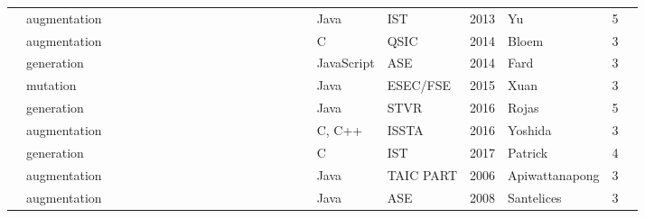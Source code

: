 \begin{table*}
\begin{adjustbox}{max width=\textwidth,center=\textwidth}
\begin{tabular}{llllllllllllllllllllllll}
            \cite{Yu2013}                                   & augmentation                      & \X &    &    &    &    &    &    & \X &    &    & \X &    &    &    &    &    & Java        & IST                                                      & 2013 & Yu             & 5 \\
            \cite{6958388}                                  & augmentation                      & \X &    &    &    & \X &    &    &    &    &    & \X &    &    &    & \X &    & C           & QSIC                                                     & 2014 & Bloem          & 3 \\
            \cite{milani2014}                               & generation                        & \X &    &    &    &    &    & \X &    &    &    & \X &    &    &    &    &    & JavaScript  & ASE                                                      & 2014 & Fard           & 3 \\
            \cite{Xuan:2015:CRV:2786805.2803206}            & mutation                          & \X &    &    &    &    & \X &    &    &    &    & \X &    &    &    &    &    & Java        & ESEC/FSE                                                 & 2015 & Xuan           & 3 \\
            \cite{rojas2016seeding}                         & generation                        & \X &    &    &    & \X &    &    &    &    &    & \X &    &    &    &    & \X & Java        & STVR                                                     & 2016 & Rojas          & 5 \\
            \cite{Yoshida2016}                              & augmentation                      & \X &    &    & \X & \X &    &    &    &    &    & \X &    &    &    & \X &    & C, C++      & ISSTA                                                    & 2016 & Yoshida        & 3 \\
            \cite{Patrick201736}                            & generation                        & \X &    &    &    &    &    & \X &    &    &    &    &    &    &    &    & \X & C           & IST                                                      & 2017 & Patrick        & 4 \\
            \cite{apiwattanapong2006matrix}                 & augmentation                      &    & \X &    &    & \X &    &    &    &    & \X &    & \X &    &    & \X &    & Java        & TAIC PART                                                & 2006 & Apiwattanapong & 3 \\
            \cite{santelices2008test}                       & augmentation                      &    & \X &    &    & \X &    &    &    &    & \X &    & \X &    &    & \X &    & Java        & ASE                                                      & 2008 & Santelices     & 3 \\

\end{tabular}
\end{adjustbox}
\end{table*}
